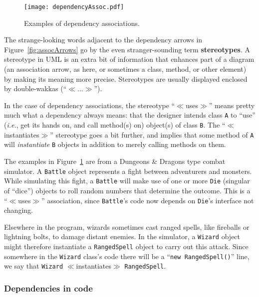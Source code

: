 \begin{figure}[ht]
\centering
\texttt{[image: dependencyAssoc.pdf]}   %
\caption{Examples of dependency associations.}
\label{fig:dependencyExamples}
\end{figure}

The strange-looking words adjacent to the dependency arrows in
Figure~\ref{fig:assocArrows} go by the even stranger-sounding term
\textbf{stereotypes}. A stereotype in UML is an extra bit of information that
enhances part of a diagram (an association arrow, as here, or sometimes a
class, method, or other element) by making its meaning more precise.
Stereotypes are usually displayed enclosed by double-wakkas
(``$\ll$...$\gg$'').

In the case of dependency associations, the stereotype ``$\ll$uses$\gg$'' means
pretty much what a dependency always means: that the designer intends class
\texttt{A} to ``use'' (\textit{i.e.}, get its hands on, and call method(s) on)
object(s) of class \texttt{B}. The ``$\ll$instantiates$\gg$'' stereotype goes a
bit further, and implies that some method of \texttt{A} will
\textit{instantiate} \texttt{B} objects in addition to merely calling methods
on them.

The examples in Figure~\ref{fig:dependencyExamples} are from a Dungeons \&
Dragons type combat simulator. A \texttt{Battle} object represents a fight
between adventurers and monsters. While simulating this fight, a
\texttt{Battle} will make use of one or more \texttt{Die} (singular of ``dice'')
objects to roll random numbers that determine the outcome. This is a
``$\ll$uses$\gg$'' association, since \texttt{Battle}'s code now depends on
\texttt{Die}'s interface not changing.

Elsewhere in the program, wizards sometimes cast ranged spells, like fireballs
or lightning bolts, to damage distant enemies. In the simulator, a
\texttt{Wizard} object might therefore instantiate a \texttt{RangedSpell}
object to carry out this attack. Since somewhere in the \texttt{Wizard} class's
code there will be a ``\texttt{new RangedSpell()}'' line, we say that
\texttt{Wizard} $\ll$instantiates$\gg$ \texttt{RangedSpell}.

\subsubsection{Dependencies in code}

